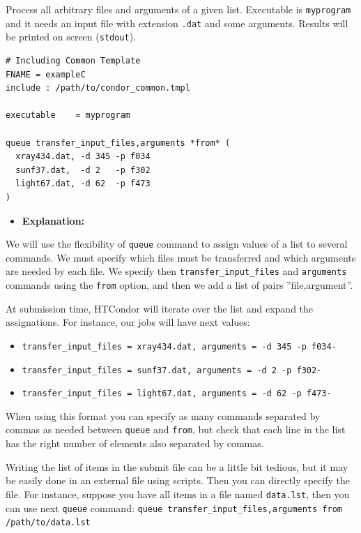 \documentclass[a4paper,10pt]{article}
\begin{document}
Process all arbitrary files and arguments of a given list. Executable is
 \texttt{myprogram} and it needs an input file with extension \texttt{.dat} and some
 arguments. Results will be printed on screen (\texttt{stdout}). 

\begin{verbatim}
# Including Common Template
FNAME = exampleC
include : /path/to/condor_common.tmpl

executable    = myprogram

queue transfer_input_files,arguments *from* (
  xray434.dat, -d 345 -p f034
  sunf37.dat,  -d 2   -p f302
  light67.dat, -d 62  -p f473
) 
\end{verbatim}

\begin{itemize}
\item \textbf{Explanation:}
\end{itemize}

We will use the flexibility of \texttt{queue} command to assign values of a list to
several commands. We must specify which files must be transferred and which
arguments are needed by each file. We specify then \texttt{transfer\_input\_files} and
\texttt{arguments} commands using the \texttt{from} option, and then we add a list of pairs
''file,argument''.

At submission time, HTCondor will iterate over the list and expand the
assignations. For instance, our jobs will have next values:

\begin{itemize}
\item \texttt{transfer\_input\_files = xray434.dat, arguments = -d 345 -p f034-}
\item \texttt{transfer\_input\_files = sunf37.dat, arguments = -d 2   -p f302-}
\item \texttt{transfer\_input\_files = light67.dat, arguments = -d 62  -p f473-}
\end{itemize}

When using this format you can specify as many commands separated by commas as
needed between \texttt{queue} and \texttt{from}, but check that each line in the list has the
right number of elements also separated by commas.

Writing the list of items in the submit file can be a little bit tedious, but it
may be easily done in an external file using scripts. Then you can directly
specify the file. For instance, suppose you have all items in a file named
\texttt{data.lst}, then you can use next \texttt{queue} command: 
\texttt{queue transfer\_input\_files,arguments from /path/to/data.lst}
\end{document}
